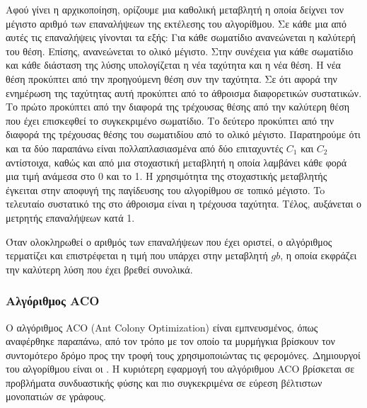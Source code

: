 \documentclass{assignment}
\begin{document}
Αφού γίνει η αρχικοποίηση, ορίζουμε μια καθολική μεταβλητή η οποία δείχνει τον
μέγιστο αριθμό των επαναλήψεων της εκτέλεσης του αλγορίθμου. Σε κάθε μια από
αυτές τις επαναλήψεις γίνονται τα εξής: Για κάθε σωματίδιο ανανεώνεται
η καλύτερή του θέση. Επίσης, ανανεώνεται το ολικό μέγιστο. Στην συνέχεια για
κάθε σωματίδιο και κάθε διάσταση της λύσης υπολογίζεται η νέα ταχύτητα και
η νέα θέση. Η νέα θέση προκύπτει από την προηγούμενη θέση συν την ταχύτητα. Σε
ότι αφορά την ενημέρωση της ταχύτητας αυτή προκύπτει από το άθροισμα
διαφορετικών συστατικών. Το πρώτο προκύπτει από την διαφορά της τρέχουσας θέσης
από την καλύτερη θέση που έχει επισκεφθεί το συγκεκριμένο σωματίδιο. Το δεύτερο
προκύπτει από την διαφορά της τρέχουσας θέσης του σωματιδίου από το ολικό
μέγιστο. Παρατηρούμε ότι και τα δύο παραπάνω είναι πολλαπλασιασμένα από δύο
επιταχυντές $C_1$ και $C_2$ αντίστοιχα, καθώς και από μια στοχαστική μεταβλητή
η οποία λαμβάνει κάθε φορά μια τιμή ανάμεσα στο 0 και το 1. Η χρησιμότητα
της στοχαστικής μεταβλητής έγκειται στην αποφυγή της παγίδευσης του αλγορίθμου
σε τοπικό μέγιστο. To τελευταίο συστατικό της στο άθροισμα είναι η τρέχουσα
ταχύτητα. Τέλος, αυξάνεται ο μετρητής επαναλήψεων κατά 1.

Όταν ολοκληρωθεί ο αριθμός των επαναλήψεων που έχει οριστεί, ο αλγόριθμος
τερματίζει και επιστρέφεται η τιμή που υπάρχει στην μεταβλητή $gb$, η οποία
εκφράζει την καλύτερη λύση που έχει βρεθεί συνολικά.
\subsubsection*{Αλγόριθμος ACO}
Ο αλγόριθμος ACO (Ant Colony Optimization) είναι εμπνευσμένος, όπως αναφέρθηκε
παραπάνω, από τον τρόπο με τον οποίο τα μυρμήγκια βρίσκουν τον συντομότερο δρόμο
προς την τροφή τους χρησιμοποιώντας τις φερομόνες. Δημιουργοί του αλγορίθμου
είναι οι \citet{dorigo2010ant}. H κυριότερη εφαρμογή του αλγόριθμου ACO
βρίσκεται σε προβλήματα συνδυαστικής φύσης και πιο συγκεκριμένα σε εύρεση
βέλτιστων μονοπατιών σε γράφους.
\end{document}
